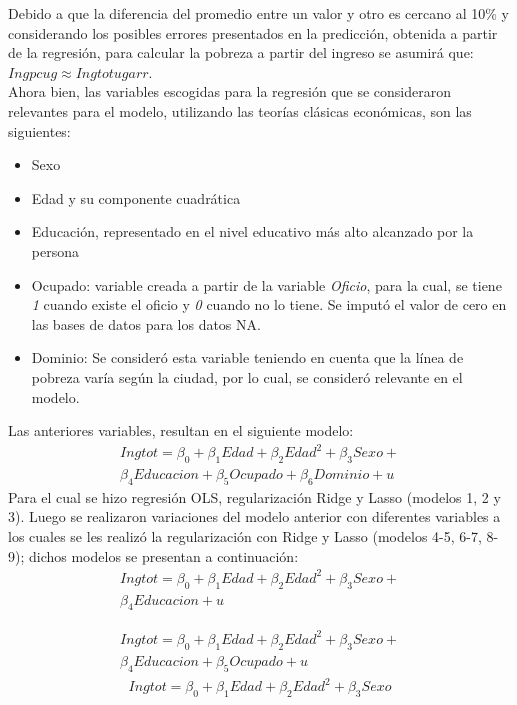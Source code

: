 \documentclass[conference, 10pt]{IEEEtran}
\begin{document}
Debido a que la diferencia del promedio entre un valor y otro es cercano al 10\% y considerando los posibles errores presentados en la predicción, obtenida a partir de la regresión, para calcular la pobreza a partir del ingreso se asumirá que: $Ingpcug\approx Ingtotugarr$.\\

Ahora bien, las variables escogidas para la regresión que se consideraron relevantes para el modelo, utilizando las teorías clásicas económicas, son las siguientes:

\begin{itemize}
\item Sexo
\item Edad y su componente cuadrática
\item Educación, representado en el nivel educativo más alto alcanzado por la persona
\item Ocupado: variable creada a partir de la variable \textit{Oficio}, para la cual, se tiene \textit{1} cuando existe el oficio y \textit{0} cuando no lo tiene. Se imputó el valor de cero en las bases de datos para los datos NA.
\item Dominio: Se consideró esta variable teniendo en cuenta que la línea de pobreza varía según la ciudad, por lo cual, se consideró relevante en el modelo.
\end{itemize}

Las anteriores variables, resultan en el siguiente modelo:\\
\begin{multline*}
Ingtot= \beta_{0}+\beta_{1}Edad+\beta_{2}Edad^{2}+\beta_{3}Sexo+\\
\beta_{4}Educacion+\beta_{5}Ocupado+\beta_{6}Dominio+u 
\end{multline*}
Para el cual se hizo regresión OLS, regularización Ridge y Lasso (modelos 1, 2 y 3). Luego se realizaron variaciones del modelo anterior con diferentes variables a los cuales se les realizó la regularización con Ridge y Lasso (modelos 4-5, 6-7, 8-9); dichos modelos se presentan a continuación:\
\begin{multline*}
Ingtot= \beta_{0}+\beta_{1}Edad+\beta_{2}Edad^{2}+\beta_{3}Sexo+\\
\beta_{4}Educacion+u 
\end{multline*}

\begin{multline*}
Ingtot= \beta_{0}+\beta_{1}Edad+\beta_{2}Edad^{2}+\beta_{3}Sexo+\\
\beta_{4}Educacion+\beta_{5}Ocupado+u 
\end{multline*}
\begin{multline*}
Ingtot= \beta_{0}+\beta_{1}Edad+\beta_{2}Edad^{2}+\beta_{3}Sexo
\end{multline*}
\end{document}
